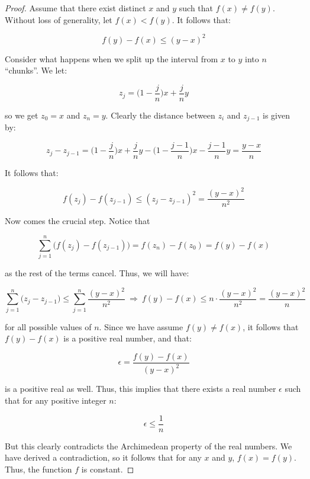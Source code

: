 \documentclass[10pt, oneside]{article}
\begin{document}
    \begin{proof}
      Assume that there exist distinct $x$ and $y$ such that $f(x) \neq f(y)$. Without loss of generality, let $f(x) < f(y)$. It follows that:

      $$f(y) - f(x) \leq (y - x)^2$$

      Consider what happens when we split up the interval from $x$ to $y$ into $n$ ``chunks''. We let:

      $$z_j = \Big(1 - \frac{j}{n} \Big) x + \frac{j}{n} y$$

      so we get $z_0 = x$ and $z_n = y$. Clearly the distance between $z_i$ and $z_{j - 1}$ is given by:

      $$z_{j} - z_{j - 1} = \Big(1 - \frac{j}{n} \Big) x + \frac{j}{n} y - \Big(1 - \frac{j - 1}{n} \Big) x - \frac{j - 1}{n} y = \frac{y - x}{n}$$

      It follows that:

      $$f(z_{j}) - f(z_{j - 1}) \leq (z_{j} - z_{j - 1})^2 =  \frac{(y - x)^2}{n^2}$$

      Now comes the crucial step. Notice that

      $$\displaystyle\sum_{j = 1}^{n} \big( f(z_{j}) - f(z_{j - 1}) \big) = f(z_{n}) - f(z_{0}) = f(y) - f(x)$$

      as the rest of the terms cancel. Thus, we will have:

      $$\displaystyle\sum_{j = 1}^{n} \big( z_{j} - z_{j - 1} \big) \leq \displaystyle\sum_{j = 1}^{n} \frac{(y - x)^2}{n^2} \ \Rightarrow \  f(y) - f(x) \leq n \cdot \frac{(y - x)^2}{n^2} = \frac{(y - x)^2}{n}$$

      for all possible values of $n$. Since we have assume $f(y) \neq f(x)$, it follows that $f(y) - f(x)$ is a positive real number, and that:

      $$\epsilon = \frac{f(y) - f(x)}{(y - x)^2}$$

      is a positive real as well. Thus, this implies that there exists a real number $\epsilon$ such that for any positive integer $n$:

      $$\epsilon \leq \frac{1}{n}$$

      But this clearly contradicts the Archimedean property of the real numbers. We have derived a contradiction, so it follows that for any $x$ and $y$, $f(x) = f(y)$. Thus,
      the function $f$ is constant.

      \end{proof}

    
\end{document}
